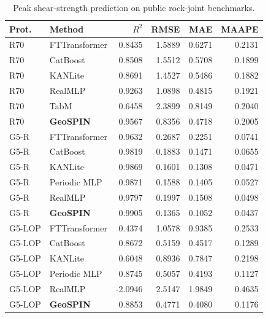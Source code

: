 \begin{table}
\caption{Peak shear-strength prediction on public rock-joint benchmarks.}
\label{tab:main_recent_benchmark_geospin}
\begin{tabular}{llrrrr}
\toprule
Prot. & Method & $R^2$ & RMSE & MAE & MAAPE \\
\midrule
R70 & FTTransformer & 0.8435 & 1.5889 & 0.6271 & 0.2131 \\
R70 & CatBoost & 0.8508 & 1.5512 & 0.5708 & 0.1899 \\
R70 & KANLite & 0.8691 & 1.4527 & 0.5486 & 0.1882 \\
R70 & RealMLP & 0.9263 & 1.0898 & 0.4815 & 0.1921 \\
R70 & TabM & 0.6458 & 2.3899 & 0.8149 & 0.2040 \\
R70 & \textbf{GeoSPIN} & 0.9567 & 0.8356 & 0.4718 & 0.2005 \\
G5-R & FTTransformer & 0.9632 & 0.2687 & 0.2251 & 0.0741 \\
G5-R & CatBoost & 0.9819 & 0.1883 & 0.1471 & 0.0655 \\
G5-R & KANLite & 0.9869 & 0.1601 & 0.1308 & 0.0471 \\
G5-R & Periodic MLP & 0.9871 & 0.1588 & 0.1405 & 0.0527 \\
G5-R & RealMLP & 0.9797 & 0.1997 & 0.1508 & 0.0498 \\
G5-R & \textbf{GeoSPIN} & 0.9905 & 0.1365 & 0.1052 & 0.0437 \\
G5-LOP & FTTransformer & 0.4374 & 1.0578 & 0.9385 & 0.2533 \\
G5-LOP & CatBoost & 0.8672 & 0.5159 & 0.4517 & 0.1289 \\
G5-LOP & KANLite & 0.6048 & 0.8936 & 0.7847 & 0.2198 \\
G5-LOP & Periodic MLP & 0.8745 & 0.5057 & 0.4193 & 0.1127 \\
G5-LOP & RealMLP & -2.0946 & 2.5147 & 1.9849 & 0.4635 \\
G5-LOP & \textbf{GeoSPIN} & 0.8853 & 0.4771 & 0.4080 & 0.1176 \\
\bottomrule
\end{tabular}
\end{table}
